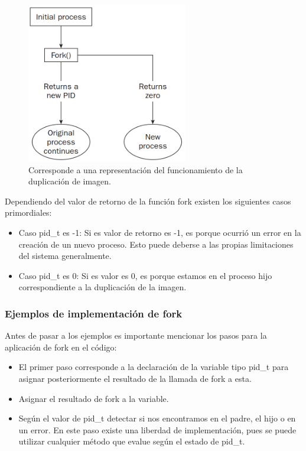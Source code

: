 \documentclass[journal]{IEEEtai}
\begin{document}
\begin{figure}[h!]
\centering
\includegraphics[width=7cm]{img/fork.png}
\caption{Corresponde a una representación del funcionamiento de la duplicación de imagen.}
\label{fig}
\end{figure}

Dependiendo del valor de retorno de la función fork existen los siguientes casos primordiales:

\begin{itemize}
\item	Caso pid\_t es -1: Si es valor de retorno es -1, es porque ocurrió un error en la creación de un nuevo proceso. Esto puede deberse a las propias limitaciones del sistema generalmente.
\item	Caso pid\_t es 0: Si es valor es 0, es porque estamos en el proceso hijo correspondiente a la duplicación de la imagen.
\end{itemize}


\subsubsection{\textbf{Ejemplos de implementación de fork}}

Antes de pasar a los ejemplos es importante mencionar los pasos para la aplicación de fork en el código:

\begin{itemize}
\item	El primer paso corresponde a la declaración de la variable tipo pid\_t para asignar posteriormente el resultado de la llamada de fork a esta.
\item	Asignar el resultado de fork a la variable.
\item	Según el valor de pid\_t detectar si nos encontramos en el padre, el hijo o en un error. En este paso existe una liberdad de implementación, pues se puede utilizar cualquier método que evalue según el estado de pid\_t.
\end{itemize}
\end{document}
